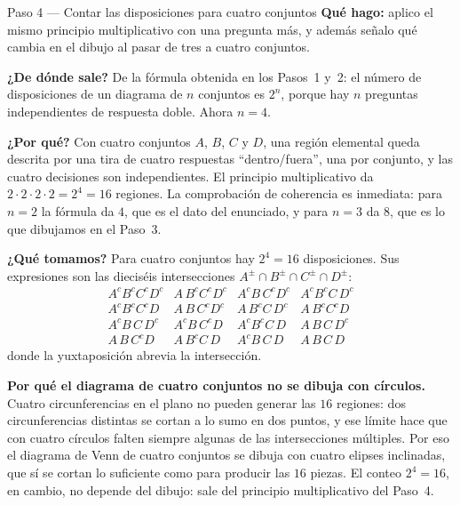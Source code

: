 \documentclass[11pt]{article}
\begin{document}
\begin{paso}{Paso 4 --- Contar las disposiciones para cuatro conjuntos}
\textbf{Qué hago:} aplico el mismo principio multiplicativo con una pregunta más, y además
señalo qué cambia en el dibujo al pasar de tres a cuatro conjuntos.

\textbf{¿De dónde sale?} De la fórmula obtenida en los Pasos~1 y~2: el número de disposiciones
de un diagrama de $n$ conjuntos es $2^{n}$, porque hay $n$ preguntas independientes de respuesta
doble. Ahora $n=4$.

\textbf{¿Por qué?} Con cuatro conjuntos $A$, $B$, $C$ y $D$, una región elemental queda descrita
por una tira de cuatro respuestas ``dentro/fuera'', una por conjunto, y las cuatro decisiones son
independientes. El principio multiplicativo da $2\cdot 2\cdot 2\cdot 2=2^{4}=16$ regiones. La
comprobación de coherencia es inmediata: para $n=2$ la fórmula da $4$, que es el dato del
enunciado, y para $n=3$ da $8$, que es lo que dibujamos en el Paso~3.

\textbf{¿Qué tomamos?} Para cuatro conjuntos hay $2^{4}=16$ disposiciones. Sus expresiones son
las dieciséis intersecciones $A^{\pm}\cap B^{\pm}\cap C^{\pm}\cap D^{\pm}$:
\[
\begin{array}{llll}
A^{c}B^{c}C^{c}D^{c} & A\,B^{c}C^{c}D^{c} & A^{c}B\,C^{c}D^{c} & A^{c}B^{c}C\,D^{c}\\
A^{c}B^{c}C^{c}D & A\,B\,C^{c}D^{c} & A\,B^{c}C\,D^{c} & A\,B^{c}C^{c}D\\
A^{c}B\,C\,D^{c} & A^{c}B\,C^{c}D & A^{c}B^{c}C\,D & A\,B\,C\,D^{c}\\
A\,B\,C^{c}D & A\,B^{c}C\,D & A^{c}B\,C\,D & A\,B\,C\,D
\end{array}
\]
donde la yuxtaposición abrevia la intersección.
\end{paso}

\begin{nota}
\textbf{Por qué el diagrama de cuatro conjuntos no se dibuja con círculos.}
Cuatro circunferencias en el plano no pueden generar las $16$ regiones: dos circunferencias
distintas se cortan a lo sumo en dos puntos, y ese límite hace que con cuatro círculos falten
siempre algunas de las intersecciones múltiples. Por eso el diagrama de Venn de cuatro conjuntos
se dibuja con cuatro elipses inclinadas, que sí se cortan lo suficiente como para producir las
$16$ piezas. El conteo $2^{4}=16$, en cambio, no depende del dibujo: sale del principio
multiplicativo del Paso~4.
\end{nota}
\end{document}
